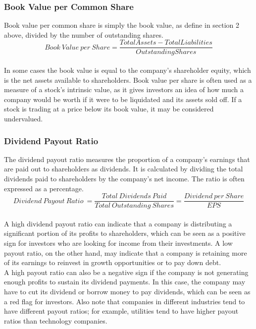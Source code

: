 \documentclass{article}
\begin{document}
\subsubsection{Book Value per Common Share}
Book value per common share is simply the book value, as define in section 2 above, divided by the number of outstanding shares. 
\begin{equation}
    Book\: Value\: per\: Share = \frac{Total Assets - Total Liabilities}{Outstanding Shares}
\end{equation}\\

In some cases the book value is equal to the company's shareholder equity, which is the net assets available to shareholders. Book value per share is often used as a measure of a stock's intrinsic value, as it gives investors an idea of how much a company would be worth if it were to be liquidated and its assets sold off. If a stock is trading at a price below its book value, it may be considered undervalued.

\subsubsection{Dividend Payout Ratio}
The dividend payout ratio measures the proportion of a company's earnings that are paid out to shareholders as dividends. It is calculated by dividing the total dividends paid to shareholders by the company's net income. The ratio is often expressed as a percentage.
\begin{equation}
    Dividend\: Payout\: Ratio\ = \frac{Total\: Dividends\: Paid}{Total\: Outstanding\: Shares} = \frac{Dividend\: per\: Share}{EPS}
\end{equation}\\


A high dividend payout ratio can indicate that a company is distributing a significant portion of its profits to shareholders, which can be seen as a positive sign for investors who are looking for income from their investments. A low payout ratio, on the other hand, may indicate that a company is retaining more of its earnings to reinvest in growth opportunities or to pay down debt.\\

A high payout ratio can also be a negative sign if the company is not generating enough profits to sustain its dividend payments. In this case, the company may have to cut its dividend or borrow money to pay dividends, which can be seen as a red flag for investors. Also note that companies in different industries tend to have different payout ratios; for example, utilities tend to have higher payout ratios than technology companies.
\end{document}
